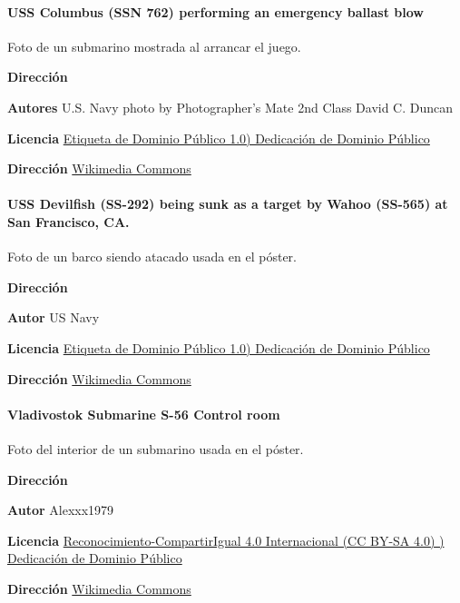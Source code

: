 \documentclass[a4paper,
	11pt,
	parskip=full,
	bibliography=totoc,
	twoside
	]{scrartcl}
\begin{document}
	\paragraph{USS Columbus (SSN 762) performing an emergency ballast blow}
	Foto de un submarino mostrada al arrancar el juego.
	\begin{labeling}{\textbf{Dirección}}
		\item[\textbf{Autores}] U.S. Navy photo by Photographer's Mate 2nd Class David C. Duncan
		\item[\textbf{Licencia}] \href{https://creativecommons.org/publicdomain/mark/1.0/deed.es_ES}{Etiqueta de Dominio Público 1.0)
			Dedicación de Dominio Público}
		\item[\textbf{Dirección}]\href{https://commons.wikimedia.org/wiki/File:980604-N-7726D-002_Submarine_Emergency_Surfacing_Drill.jpg}{Wikimedia Commons}
	\end{labeling}

	\paragraph{USS Devilfish (SS-292) being sunk as a target by Wahoo (SS-565) at San Francisco, CA.}
	Foto de un barco siendo atacado usada en el póster.
	\begin{labeling}{\textbf{Dirección}}
		\item[\textbf{Autor}] US Navy
		\item[\textbf{Licencia}] \href{https://creativecommons.org/publicdomain/mark/1.0/deed.es_ES}{Etiqueta de Dominio Público 1.0)
			Dedicación de Dominio Público}
		\item[\textbf{Dirección}]\href{https://commons.wikimedia.org/wiki/File:USS_Devilfish_sunk_as_target_1968.jpg}{Wikimedia Commons}
	\end{labeling}

	\paragraph{Vladivostok Submarine S-56 Control room}
	Foto del interior de un submarino usada en el póster.
	\begin{labeling}{\textbf{Dirección}}
		\item[\textbf{Autor}]  	Alexxx1979
		\item[\textbf{Licencia}] \href{https://creativecommons.org/licenses/by-sa/4.0/deed.es}{Reconocimiento-CompartirIgual 4.0 Internacional (CC BY-SA 4.0) )
			Dedicación de Dominio Público}
		\item[\textbf{Dirección}]\href{https://commons.wikimedia.org/wiki/File:Vladivostok_Submarine_S-56_Control_room_P8050518_2475.jpg}{Wikimedia Commons}
	\end{labeling}
\doublespacing
\end{document}
